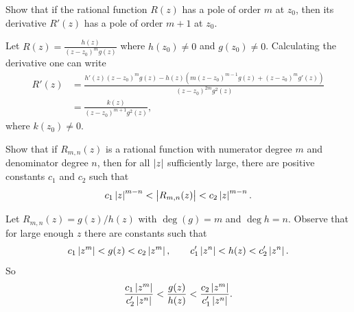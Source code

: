 \begin{problem}
	Show that if the rational function $ R(z) $ has a pole of order $ m $ at $ z_0 $, then its derivative $ R'(z) $ has a pole of order $ m+1 $ at $ z_0 $.
\end{problem}
\begin{solution}
	Let $ R(z) = \frac{h(z)}{(z-z_0)^m g(z)} $ where $ h(z_0) \neq 0 $ and $ g(z_0)\neq 0 $. Calculating the derivative one can write
	\begin{align*}
		R'(z) &= \frac{h'(z)(z-z_0)^mg(z) - h(z)(m(z-z_0)^{m-1}g(z) + (z-z_0)^mg'(z))}{(z-z_0)^{2m}g^2(z)} \\
		&=\frac{k(z)}{(z-z_0)^{m+1}g^2(z)},
	\end{align*}
	where $ k(z_0) \neq 0 $.
\end{solution}

\begin{problem}
	Show that if $ R_{m,n}(z) $ is a rational function with numerator degree $ m $ and denominator degree $ n $, then for all $ \left|z\right| $ sufficiently large, there are positive constants $ c_1 $ and $ c_2 $ such that 
	\[ c_1\left|z\right|^{m-n} < \left|R_{m,n}(z)\right| < c_2\left|z\right|^{m-n}. \]
\end{problem}
\begin{solution}
	Let $ R_{m,n}(z) = g(z) / h(z) $ with $ \deg(g) = m $ and $ \deg{h} = n$. Observe that for large enough $ z $ there are constants such that
	\[ c_1\left|z^m\right| < g(z) < c_2 \left|z^m\right|, \qquad c_1'\left|z^n\right| < h(z) < c_2'\left|z^n\right|.  \]
	So
	\[ \frac{c_1\left|z^m\right|}{c_2'\left|z^n\right|} < \frac{g(z)}{h(z)} < \frac{c_2\left|z^m\right|}{c_1'\left|z^n\right|}. \]
	
\end{solution}